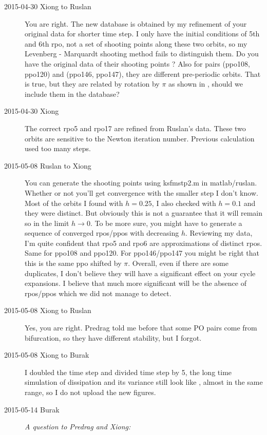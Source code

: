 \begin{description}
\item[2015-04-30 Xiong to Ruslan] You are right. The new database is
obtained by my refinement of your original data for shorter time step.
I only have the initial
conditions of 5th and 6th rpo, not a set of shooting points along these
two orbits, so my Levenberg - Marquardt shooting method fails to distinguish
them. Do you have the original data of their shooting points ?
Also for
pairs (ppo108, ppo120) and (ppo146, ppo147), they are different
pre-periodic orbits. That is true,  but they are
related by rotation by $\pi$
as shown in , should we include
them in the database?

\item[2015-04-30 Xiong] The correct rpo5 and rpo17 are refined from
Ruslan's data. These two orbits are sensitive to the Newton iteration
number. Previous calculation used too many steps.

\item[2015-05-08 Ruslan to Xiong] You can generate the shooting
points using ksfmstp2.m in matlab/ruslan.  Whether or not you'll get
convergence with the smaller step I don't know.  Most of the orbits
I found with $h=0.25$, I also checked with $h=0.1$ and they were
distinct. But obviously this is not a guarantee that it will remain
so in the limit $h \to 0$.  To be more sure, you might have to
generate a sequence of converged rpos/ppos with decreasing $h$.
Reviewing my data, I'm quite confident that rpo5 and rpo6 are
approximations of distinct rpos.  Same for ppo108 and ppo120.  For
ppo146/ppo147 you might be right that this is the same ppo shifted
by $\pi$.  Overall, even if there are some duplicates, I don't
believe they will have a significant effect on your cycle
expansions.  I believe that much more significant will be the
absence of rpos/ppos which we did not manage to detect.

\item[2015-05-08 Xiong to Ruslan] Yes, you are right. Predrag told me
before that some PO pairs come from bifurcation, so they have different
stability, but I forgot.

\item[2015-05-08 Xiong to Burak] I doubled the time step and divided
time step by 5, the long time simulation of dissipation and its variance
still look like , almost in the same range, so I do
not upload the new figures.

\item[2015-05-14 Burak] \emph{A question to Predrag and Xiong:}


\end{description}
